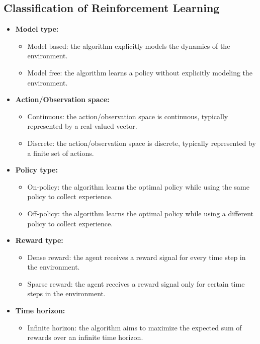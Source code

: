 \subsection{Classification of Reinforcement Learning}
\begin{minipage}{\textwidth}
\begin{itemize}

    \item \textbf{Model type:}
    \begin{itemize}
    \item Model based: the algorithm explicitly models the dynamics of the environment.
    \item Model free: the algorithm learns a policy without explicitly modeling the environment.
    \end{itemize}
    \item \textbf{Action/Observation space:}
    \begin{itemize}
    \item Continuous: the action/observation space is continuous, typically represented by a real-valued vector.
    \item Discrete: the action/observation space is discrete, typically represented by a finite set of actions.
    \end{itemize}
    \item \textbf{Policy type:}
    \begin{itemize}
    \item On-policy: the algorithm learns the optimal policy while using the same policy to collect experience.
    \item Off-policy: the algorithm learns the optimal policy while using a different policy to collect experience.
    \end{itemize}
    \item \textbf{Reward type:}
    \begin{itemize}
    \item Dense reward: the agent receives a reward signal for every time step in the environment.
    \item Sparse reward: the agent receives a reward signal only for certain time steps in the environment.
    \end{itemize}
    \item \textbf{Time horizon:}
    \begin{itemize}
    \item Infinite horizon: the algorithm aims to maximize the expected sum of rewards over an infinite time horizon.

\end{itemize}
\end{itemize}
\end{minipage}
